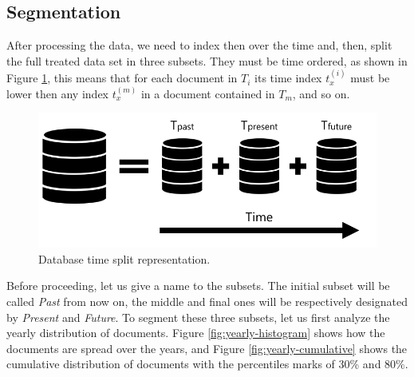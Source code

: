 \subsection{Segmentation}

After processing the data, we need to index then over the time and, then, split the full treated data set in three subsets. They must be time ordered, as shown in Figure \ref{fig:database}, this means that for each document in $T_{i}$ its time index $t_{x}^{(i)}$ must be lower then any index $t_{x}^{(m)}$ in a document contained in $T_{m}$, and so on.

\begin{figure}[h!]
	\centering
	\includegraphics[width=0.6\linewidth]{01.Chapters/04.Materials/database}
	\caption{Database time split representation.}
	\label{fig:database}
\end{figure}

Before proceeding, let us give a name to the subsets. The initial subset will be called \textit{Past} from now on, the middle and final ones will be respectively designated by \textit{Present} and \textit{Future}. To segment these three subsets, let us first analyze the yearly distribution of documents. Figure \ref{fig:yearly-histogram} shows how the documents are spread over the years, and Figure \ref{fig:yearly-cumulative} shows the cumulative distribution of documents with the percentiles marks of 30\% and 80\%.

